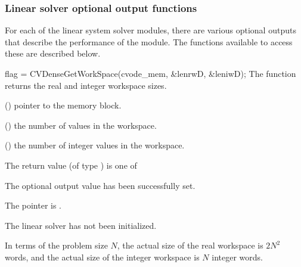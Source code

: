 
\subsubsection{Linear solver optional output functions}\label{sss:linsolv_io}

For each of the linear system solver modules, there are various optional 
outputs that describe the performance of the module. The functions available 
to access these are described below.

\vspace{0.1in}
{
  flag = CVDenseGetWorkSpace(cvode\_mem, \&lenrwD, \&leniwD);
}
{
  The function  returns the
  {\cvdense} real and integer workspace sizes.
}
{
  \begin{args}
  \item[cvode\_mem] ()
    pointer to the {\cvode} memory block.
  \item[lenrwD] ()
    the number of  values in the {\cvdense} workspace.
  \item[leniwD] ()
    the number of integer values in the {\cvdense} workspace.
  \end{args}
}
{
  The return value  (of type ) is one of
  \begin{args}
  \item[\Id{CVDENSE\_SUCCESS}] 
    The optional output value has been successfully set.
  \item[\Id{CVDENSE\_MEM\_NULL}]
    The  pointer is .
  \item[\Id{CVDENSE\_LMEM\_NULL}]
    The {\cvdense} linear solver has not been initialized.
  \end{args}
}
{
  In terms of the problem size $N$, the actual size of the real workspace
  is $2N^2$  words, and the actual size of the integer workspace
  is $N$ integer words.
}
